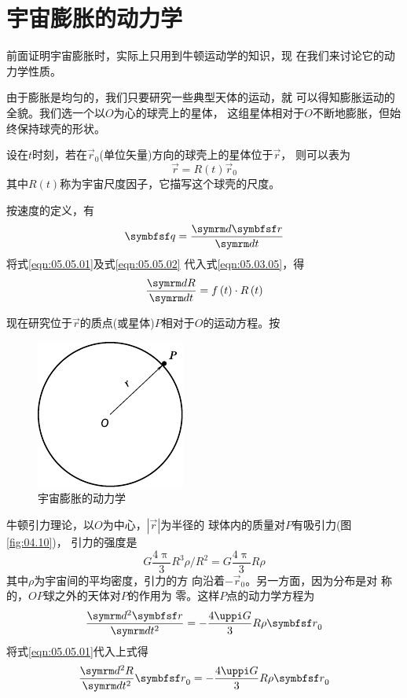 \section{宇宙膨胀的动力学}\label{sec:05.05}

前面证明宇宙膨胀时，实际上只用到牛顿运动学的知识，现
在我们来讨论它的动力学性质。

由于膨胀是均匀的，我们只要研究一些典型天体的运动，就
\clearpage\noindent
可以得知膨胀运动的全貌。我们选一个以$ O $为心的球壳上的星体，
这组星体相对于$ O $不断地膨胀，但始终保持球壳的形状。

设在$ t $时刻，若在$ \vec{r}_0 $(单位矢量)方向的球壳上的星体位于$ \vec{r} $，
则可以表为
\begin{equation}\label{eqn:05.05.01}
  \vec{r} = R \left( t \right) \vec{r} _ { 0 }
\end{equation}
其中$ R\left(t\right) $称为宇宙尺度因子，它描写这个球壳的尺度。

按速度的定义，有
\begin{equation}\label{eqn:05.05.02}
  \vec{q} = \frac { \dif \vec{r} } { \dif t }
\end{equation}
将式\eqref{eqn:05.05.01}及式\eqref{eqn:05.05.02} 代入式\eqref{eqn:05.03.05}，得
\begin{equation}\label{eqn:05.05.03}
  \frac { \dif R } { \dif t } = f \left( t \right) \cdot R \left( t \right)
\end{equation}

现在研究位于$\vec{r}$的质点(或星体)$ P $相对于$ O $的运动方程。按
\begin{figure}
  \centering
  \includegraphics{figure/fig05.04}
  \caption{宇宙膨胀的动力学}
  \label{fig:05.04}
\end{figure}
牛顿引力理论，以$ O $为中心，$ |\vec{r}| $为半径的
球体内的质量对$ P $有吸引力(图\ref{fig:04.10})，
引力的强度是
\begin{equation*}
  G \frac { 4 \uppi } { 3 } R ^ { 3 } \rho / R ^ { 2 } = G \frac { 4 \uppi } { 3 } R \rho
\end{equation*}
其中$ \rho $为宇宙间的平均密度，引力的方
向沿着$ - \vec{r} _ 0 $。另一方面，因为分布是对
称的，$ OP $球之外的天体对$ P $的作用为
零。这样$ P $点的动力学方程为
\begin{equation*}
  \frac { \dif ^ { 2 } \vec{r} } { \dif t ^ { 2 } } = - \frac { 4 \uppi G } { 3 } R \rho \vec{ r } _ 0
\end{equation*}
将式\eqref{eqn:05.05.01}代入上式得
\begin{equation*}
  \frac { \dif ^ { 2 } R } { \dif t ^ { 2 } } \vec{r} _ { 0 } = - \frac { 4 \uppi G } { 3 } R \rho \vec{r} _ 0
\end{equation*}

